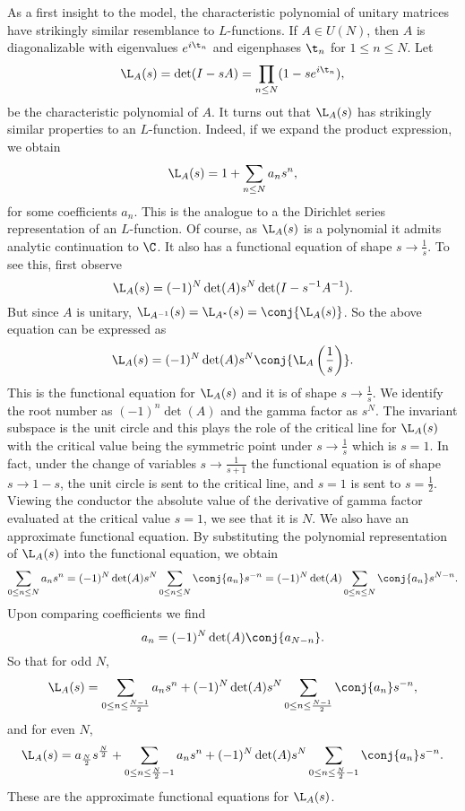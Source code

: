       As a first insight to the model, the characteristic polynomial of unitary matrices have strikingly similar resemblance to $L$-functions. If $A \in U(N)$, then $A$ is diagonalizable with eigenvalues $e^{i\t_{n}}$ and eigenphases $\t_{n}$ for $1 \le n \le N$. Let
      \[
        \L_{A}(s) = \det(I-sA) = \prod_{n \le N}(1-se^{i\t_{n}}),
      \]
      be the characteristic polynomial of $A$. It turns out that $\L_{A}(s)$ has strikingly similar properties to an $L$-function. Indeed, if we expand the product expression, we obtain
      \[
        \L_{A}(s) = 1+\sum_{n \le N}a_{n}s^{n},
      \]
      for some coefficients $a_{n}$. This is the analogue to a the Dirichlet series representation of an $L$-function. Of course, as $\L_{A}(s)$ is a polynomial it admits analytic continuation to $\C$. It also has a functional equation of shape $s \to \frac{1}{s}$. To see this, first observe
      \[
        \L_{A}(s) = (-1)^{N}\det(A)s^{N}\det(I-s^{-1}A^{-1}).
      \]
      But since $A$ is unitary, $\L_{A^{-1}}(s) = \L_{A^{\ast}}(s) = \conj{\L_{A}(s)}$. So the above equation can be expressed as
      \[
        \L_{A}(s) = (-1)^{N}\det(A)s^{N}\conj{\L_{A}\left(\frac{1}{s}\right)}.
      \]
      This is the functional equation for $\L_{A}(s)$ and it is of shape $s \to \frac{1}{s}$. We identify the root number as $(-1)^{n}\det(A)$ and the gamma factor as $s^{N}$. The invariant subspace is the unit circle and this plays the role of the critical line for $\L_{A}(s)$ with the critical value being the symmetric point under $s \to \frac{1}{s}$ which is $s = 1$. In fact, under the change of variables $s \to \frac{1}{s+1}$ the functional equation is of shape $s \to 1-s$, the unit circle is sent to the critical line, and $s = 1$ is sent to $s = \frac{1}{2}$. Viewing the conductor the absolute value of the derivative of gamma factor evaluated at the critical value $s = 1$, we see that it is $N$. We also have an approximate functional equation. By substituting the polynomial representation of $\L_{A}(s)$ into the functional equation, we obtain
      \[
        \sum_{0 \le n \le N}a_{n}s^{n} = (-1)^{N}\det(A)s^{N}\sum_{0 \le n \le N}\conj{a_{n}}s^{-n} = (-1)^{N}\det(A)\sum_{0 \le n \le N}\conj{a_{n}}s^{N-n}.
      \]
      Upon comparing coefficients we find
      \[
        a_{n} = (-1)^{N}\det(A)\conj{a_{N-n}}.
      \]
      So that for odd $N$,
      \[
        \L_{A}(s) = \sum_{0 \le n \le \frac{N-1}{2}}a_{n}s^{n}+(-1)^{N}\det(A)s^{N}\sum_{0 \le n \le \frac{N-1}{2}}\conj{a_{n}}s^{-n},
      \]
      and for even $N$,
      \[
        \L_{A}(s) = a_{\frac{N}{2}}s^{\frac{N}{2}}+\sum_{0 \le n \le \frac{N}{2}-1}a_{n}s^{n}+(-1)^{N}\det(A)s^{N}\sum_{0 \le n \le \frac{N}{2}-1}\conj{a_{n}}s^{-n}.
      \]
      These are the approximate functional equations for $\L_{A}(s)$.

